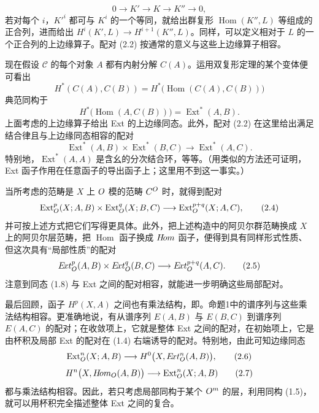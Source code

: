 \[
0\longrightarrow K'\longrightarrow K\longrightarrow K''\longrightarrow0,
\]
若对每个 $i$，$K'^i$ 都可与 $K^i$ 的一个等同，就给出群复形 $\operatorname{Hom}(K'',L)$ 等组成的正合列，进而给出
$H^i(K',L)\to H^{i+1}(K'',L)$。同样，可以定义相对于 $L$ 的一个正合列的上边缘算子。配对 (2.2) 按通常的意义与这些上边缘算子相容。

现在假设 $\mathcal C$ 的每个对象 $A$ 都有内射分解 $C(A)$。运用双复形定理的某个变体便可看出
\[
H^*(C(A),C(B))=H^*\bigl(\operatorname{Hom}(C(A),C(B))\bigr)
\]
典范同构于
\[
H^*\bigl(\operatorname{Hom}(A,C(B))\bigr)=\operatorname{Ext}^*(A,B).
\]
上面考虑的上边缘算子给出 Ext 的上边缘同态。此外，配对 (2.2) 在这里给出满足结合律且与上边缘同态相容的配对
\begin{equation}
\operatorname{Ext}^*(A,B)\times\operatorname{Ext}^*(B,C)
\longrightarrow\operatorname{Ext}^*(A,C).
\tag{2.3}
\end{equation}
特别地，$\operatorname{Ext}^*(A,A)$ 是含幺的分次结合环，等等。（用类似的方法还可证明，Ext 函子作用在任意函子的导出函子上；这里用不到这一事实。）

当所考虑的范畴是 $X$ 上 $O$ 模的范畴 $C^{O}$ 时，就得到配对
\begin{equation}
\operatorname{Ext}_{O}^{p}(X;A,B)\times
\operatorname{Ext}_{O}^{q}(X;B,C)
\longrightarrow\operatorname{Ext}_{O}^{p+q}(X;A,C),
\tag{2.4}
\end{equation}
并可按上述方式把它们写得更具体。此外，把上述构造中的阿贝尔群范畴换成 $X$ 上的阿贝尔层范畴，把 $\operatorname{Hom}$ 函子换成 $H\!om$ 函子，便得到具有同样形式性质、但这次具有“局部性质”的配对
\begin{equation}
E\!xt_{O}^{p}(A,B)\times E\!xt_{O}^{q}(B,C)
\longrightarrow E\!xt_{O}^{p+q}(A,C).
\tag{2.5}
\end{equation}
注意到同态 (1.8) 与 Ext 之间的配对相容，就能进一步明确这些局部配对。

最后回顾，函子 $H^p(X,A)$ 之间也有乘法结构，即。命题1中的谱序列与这些乘法结构相容。更准确地说，有从谱序列 $E(A,B)$ 与 $E(B,C)$ 到谱序列 $E(A,C)$ 的配对；在收敛项上，它就是整体 Ext 之间的配对，在初始项上，它是由杯积及局部 Ext 的配对在 (1.4) 右端诱导的配对。特别地，由此可知边缘同态
\begin{equation}
\operatorname{Ext}_{O}^{n}(X;A,B)\longrightarrow
H^0\bigl(X,E\!xt_{O}^{n}(A,B)\bigr),\tag{2.6}
\end{equation}
\begin{equation}
H^n\bigl(X,H\!om_{O}(A,B)\bigr)\longrightarrow
\operatorname{Ext}_{O}^{n}(X;A,B)\tag{2.7}
\end{equation}
都与乘法结构相容。因此，若只考虑局部同构于某个 $O^m$ 的层，利用同构 (1.5)，就可以用杯积完全描述整体 Ext 之间的复合。

